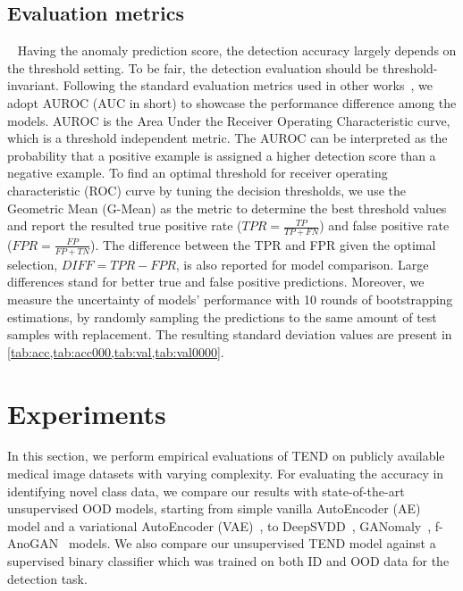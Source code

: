 \documentclass[12pt]{spieman}  %
\begin{document}
\begin{spacing}{2}
\subsection{Evaluation metrics}~\label{eval_metrics}
Having the anomaly prediction score, the detection accuracy largely depends on the threshold setting. To be fair, the detection evaluation should be threshold-invariant. Following the standard evaluation metrics used in other works~\cite{yu2019unsupervised,liang2017enhancing}, we adopt AUROC (AUC in short) to showcase the performance difference among the models. AUROC is the Area Under the Receiver Operating Characteristic curve, which is a threshold independent metric. The AUROC can be interpreted as the probability that a positive example is assigned a higher detection score than a negative example. To find an optimal threshold for receiver operating characteristic (ROC) curve by tuning the decision thresholds, we use the Geometric Mean (G-Mean) as the metric to determine the best threshold values and report the resulted true positive rate ($TPR = {\frac{TP}{TP+FN}}$) and false positive rate ($FPR = {\frac{FP}{FP+TN}}$). The difference between the TPR and FPR given the optimal selection, $DIFF=TPR-FPR$, is also reported for model comparison. Large differences stand for better true and false positive predictions. Moreover, we measure the uncertainty of models' performance with 10 rounds of bootstrapping estimations, by randomly sampling the predictions to the same amount of test samples with replacement. The resulting standard deviation values are present in \cref{tab:acc,tab:acc000,tab:val,tab:val0000}.


\section{Experiments}
In this section, we perform empirical evaluations of TEND on publicly available medical image datasets with varying complexity. For evaluating the accuracy in identifying novel class data, we compare our results with state-of-the-art unsupervised OOD models, starting from simple vanilla AutoEncoder (AE)~\cite{mcclelland1986parallel} model and a variational AutoEncoder (VAE)~\cite{an2015variational:an}, to DeepSVDD~\cite{ruff2018deep:ruff}, GANomaly~\cite{akcay2018ganomaly:akcay}, f-AnoGAN~\cite{schlegl2019f} models. We also compare our unsupervised TEND model against a supervised binary classifier which was trained on both ID and OOD data for the detection task. 


\end{spacing}
\end{document}
